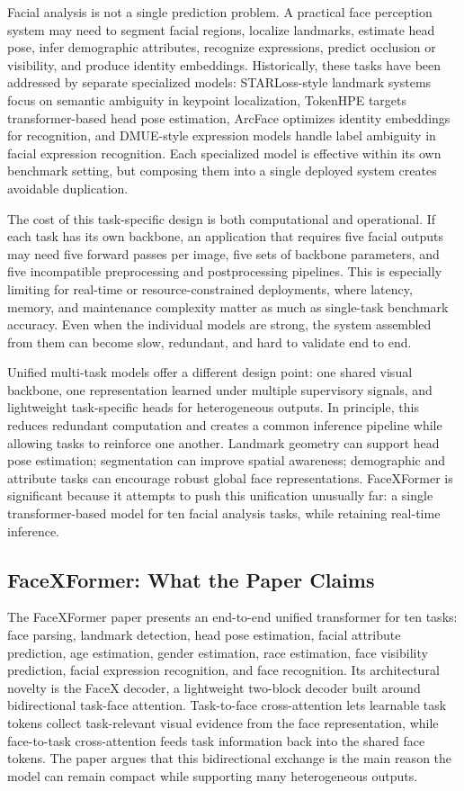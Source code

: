 \documentclass[11pt]{article}
\begin{document}
Facial analysis is not a single prediction problem. A practical face perception system may need to segment facial regions, localize landmarks, estimate head pose, infer demographic attributes, recognize expressions, predict occlusion or visibility, and produce identity embeddings. Historically, these tasks have been addressed by separate specialized models: STARLoss-style landmark systems focus on semantic ambiguity in keypoint localization, TokenHPE targets transformer-based head pose estimation, ArcFace optimizes identity embeddings for recognition, and DMUE-style expression models handle label ambiguity in facial expression recognition. Each specialized model is effective within its own benchmark setting, but composing them into a single deployed system creates avoidable duplication.


The cost of this task-specific design is both computational and operational. If each task has its own backbone, an application that requires five facial outputs may need five forward passes per image, five sets of backbone parameters, and five incompatible preprocessing and postprocessing pipelines. This is especially limiting for real-time or resource-constrained deployments, where latency, memory, and maintenance complexity matter as much as single-task benchmark accuracy. Even when the individual models are strong, the system assembled from them can become slow, redundant, and hard to validate end to end.


Unified multi-task models offer a different design point: one shared visual backbone, one representation learned under multiple supervisory signals, and lightweight task-specific heads for heterogeneous outputs. In principle, this reduces redundant computation and creates a common inference pipeline while allowing tasks to reinforce one another. Landmark geometry can support head pose estimation; segmentation can improve spatial awareness; demographic and attribute tasks can encourage robust global face representations. FaceXFormer is significant because it attempts to push this unification unusually far: a single transformer-based model for ten facial analysis tasks, while retaining real-time inference.


\subsection{FaceXFormer: What the Paper Claims}


The FaceXFormer paper presents an end-to-end unified transformer for ten tasks: face parsing, landmark detection, head pose estimation, facial attribute prediction, age estimation, gender estimation, race estimation, face visibility prediction, facial expression recognition, and face recognition. Its architectural novelty is the FaceX decoder, a lightweight two-block decoder built around bidirectional task-face attention. Task-to-face cross-attention lets learnable task tokens collect task-relevant visual evidence from the face representation, while face-to-task cross-attention feeds task information back into the shared face tokens. The paper argues that this bidirectional exchange is the main reason the model can remain compact while supporting many heterogeneous outputs.
\end{document}
